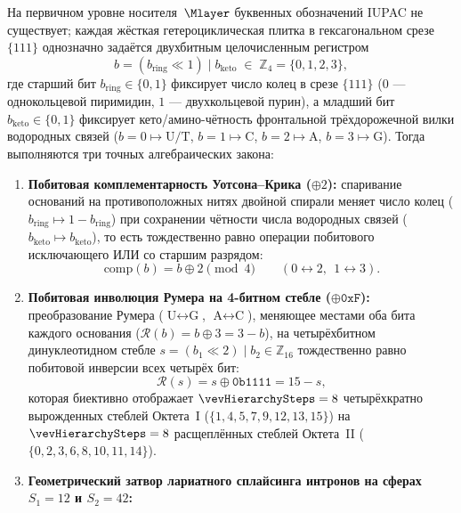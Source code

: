 \begin{theorem}
\label{thm:bio-z4-rumer-splicing}
На первичном уровне носителя~$\Mlayer$ буквенных обозначений IUPAC не существует; каждая жёсткая гетероциклическая плитка в гексагональном срезе $\{111\}$ однозначно задаётся двухбитным целочисленным регистром
\begin{equation}
\label{eq:bio-z4-register}
  b = (b_{\mathrm{ring}} \ll 1) \;\big|\; b_{\mathrm{keto}} \;\in\; \mathbb{Z}_4 = \{0, 1, 2, 3\},
\end{equation}
где старший бит $b_{\mathrm{ring}}\in\{0,1\}$ фиксирует число колец в срезе $\{111\}$ ($0$ --- однокольцевой пиримидин, $1$ --- двухкольцевой пурин), а младший бит $b_{\mathrm{keto}}\in\{0,1\}$ фиксирует кето/амино-чётность фронтальной трёхдорожечной вилки водородных связей ($b=0\mapsto\text{U/T}$, $b=1\mapsto\text{C}$, $b=2\mapsto\text{A}$, $b=3\mapsto\text{G}$). Тогда выполняются три точных алгебраических закона:
\begin{enumerate}[leftmargin=*]
\item \textbf{Побитовая комплементарность Уотсона--Крика ($\oplus 2$):}
  спаривание оснований на противоположных нитях двойной спирали меняет число колец ($b_{\mathrm{ring}}\mapsto 1-b_{\mathrm{ring}}$) при сохранении чётности числа водородных связей ($b_{\mathrm{keto}}\mapsto b_{\mathrm{keto}}$), то есть тождественно равно операции побитового исключающего ИЛИ со старшим разрядом:
  \[
    \mathrm{comp}(b) = b \oplus 2 \pmod{4}\qquad (0\leftrightarrow 2,\ \ 1\leftrightarrow 3).
  \]
\item \textbf{Побитовая инволюция Румера на 4-битном стебле ($\oplus\texttt{0xF}$):}
  преобразование Румера ($\text{U}\leftrightarrow\text{G}$, $\text{A}\leftrightarrow\text{C}$), меняющее местами оба бита каждого основания ($\mathcal{R}(b) = b \oplus 3 = 3 - b$), на четырёхбитном динуклеотидном стебле $s = (b_1\ll 2)\mid b_2 \in \mathbb{Z}_{16}$ тождественно равно побитовой инверсии всех четырёх бит:
  \begin{equation}
  \label{eq:bio-rumer-bitwise-xor}
    \mathcal{R}(s) = s \oplus \texttt{0b1111} = 15 - s,
  \end{equation}
  которая биективно отображает $\vevHierarchySteps = 8$ четырёхкратно вырожденных стеблей Октета~I ($\{1, 4, 5, 7, 9, 12, 13, 15\}$) на $\vevHierarchySteps = 8$ расщеплённых стеблей Октета~II ($\{0, 2, 3, 6, 8, 10, 11, 14\}$).
\item \textbf{Геометрический затвор лариатного сплайсинга интронов на сферах $S_1 = 12$ и $S_2 = 42$:}

\end{enumerate}
\end{theorem}
